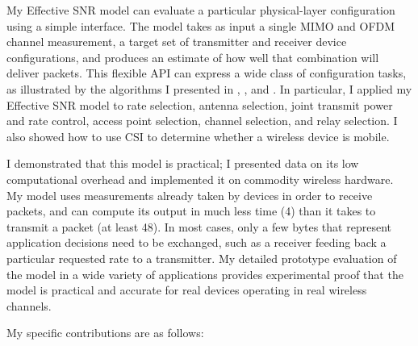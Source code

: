 My Effective SNR model can evaluate a particular physical-layer configuration using a simple interface. The model takes as input a single MIMO and OFDM channel measurement, a target set of transmitter and receiver device configurations, and produces an estimate of how well that combination will deliver packets. This flexible API can express a wide class of configuration tasks, as illustrated by the algorithms I presented in , , and . In particular, I applied my Effective SNR model to rate selection, antenna selection, joint transmit power and rate control, access point selection, channel selection, and relay selection. I also showed how to use CSI to determine whether a wireless device is mobile.

I demonstrated that this model is practical; I presented data on its low computational overhead and implemented it on commodity wireless hardware. My model uses measurements already taken by devices in order to receive packets, and can compute its output in much less time (4\us) than it takes to transmit a packet (at least 48\us). In most cases, only a few bytes that represent application decisions need to be exchanged, such as a receiver feeding back a particular requested rate to a transmitter. My detailed prototype evaluation of the model in a wide variety of applications provides experimental proof that the model is practical and accurate for real devices operating in real wireless channels.%

\noheading My specific contributions are as follows:

